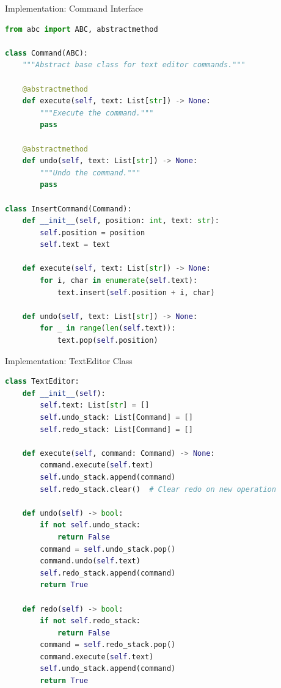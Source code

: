 \documentclass[aspectratio=169,xcolor=dvipsnames]{beamer}
\begin{document}
\begin{frame}[fragile]{Implementation: Command Interface}
\begin{lstlisting}[language=Python, basicstyle=\tiny\ttfamily]
from abc import ABC, abstractmethod

class Command(ABC):
    """Abstract base class for text editor commands."""

    @abstractmethod
    def execute(self, text: List[str]) -> None:
        """Execute the command."""
        pass

    @abstractmethod
    def undo(self, text: List[str]) -> None:
        """Undo the command."""
        pass

class InsertCommand(Command):
    def __init__(self, position: int, text: str):
        self.position = position
        self.text = text

    def execute(self, text: List[str]) -> None:
        for i, char in enumerate(self.text):
            text.insert(self.position + i, char)

    def undo(self, text: List[str]) -> None:
        for _ in range(len(self.text)):
            text.pop(self.position)
\end{lstlisting}
\end{frame}

\begin{frame}[fragile]{Implementation: TextEditor Class}
\begin{lstlisting}[language=Python, basicstyle=\tiny\ttfamily]
class TextEditor:
    def __init__(self):
        self.text: List[str] = []
        self.undo_stack: List[Command] = []
        self.redo_stack: List[Command] = []

    def execute(self, command: Command) -> None:
        command.execute(self.text)
        self.undo_stack.append(command)
        self.redo_stack.clear()  # Clear redo on new operation

    def undo(self) -> bool:
        if not self.undo_stack:
            return False
        command = self.undo_stack.pop()
        command.undo(self.text)
        self.redo_stack.append(command)
        return True

    def redo(self) -> bool:
        if not self.redo_stack:
            return False
        command = self.redo_stack.pop()
        command.execute(self.text)
        self.undo_stack.append(command)
        return True
\end{lstlisting}
\end{frame}
\end{document}
